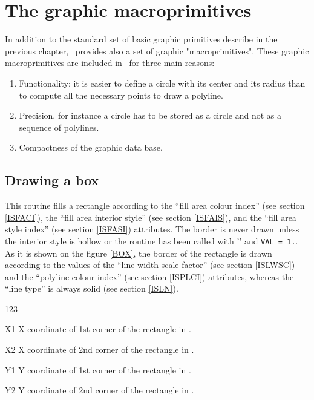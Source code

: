 \chapter{The graphic macroprimitives}

In addition to the standard set of basic graphic primitives describe
in the previous chapter, \HIGZ~provides also a set of graphic "macroprimitives".
These graphic macroprimitives are included in \HIGZ~for three main reasons:
\begin{enumerate}
\item Functionality: it is easier to define a circle with its center and its
      radius than to compute all the necessary points to draw a polyline.
\item Precision, for instance a circle has to be stored as a circle and not as
      a sequence of polylines.
\item Compactness of the graphic data base.
\end{enumerate}

\section{Drawing a box}
\Action
This routine fills a rectangle according to the ``fill area colour index''
(see section \ref{ISFACI}), the ``fill area interior style'' (see section
\ref{ISFAIS}), and the ``fill area style index'' (see section \ref{ISFASI})
attributes. The border is never drawn unless the interior
style is hollow or the routine  has been called with ''
and {\tt VAL = 1.}. As it is shown on the figure \ref{BOX}, the border of the
rectangle is drawn according to the values of the ``line width scale factor''
(see section \ref{ISLWSC}) and the ``polyline colour index'' (see section
\ref{ISPLCI}) attributes, whereas the ``line type'' is always solid (see
section \ref{ISLN}).
\Pdesc
\begin{DLtt}{123}
\item[X1] X coordinate of 1st corner of the rectangle in \wc.
\item[X2] X coordinate of 2nd corner of the rectangle in \wc.
\item[Y1] Y coordinate of 1st corner of the rectangle in \wc.
\item[Y2] Y coordinate of 2nd corner of the rectangle in \wc.
\end{DLtt}

